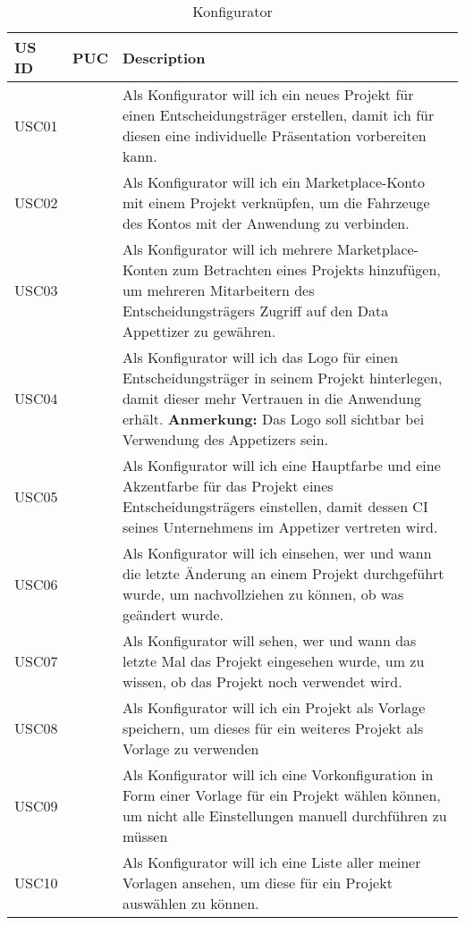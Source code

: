  \sffamily
  \begin{footnotesize}
    \renewcommand{\arraystretch}{1.4}
    \begin{longtable}[i i L]{ p{} p{} p{} }
      \caption                       %
          {Konfigurator} %
          \\
      \toprule
      \textbf{US ID} & \textbf{PUC} & \textbf{Description} \\
      \midrule

      USC01 & & Als Konfigurator will ich ein neues Projekt für einen Entscheidungsträger erstellen, damit ich für diesen eine individuelle Präsentation vorbereiten kann. \\
      USC02 & & Als Konfigurator will ich ein Marketplace-Konto mit einem Projekt verknüpfen, um die Fahrzeuge des Kontos mit der Anwendung zu verbinden. \\
      USC03 & & Als Konfigurator will ich mehrere Marketplace-Konten zum Betrachten eines Projekts hinzufügen, um mehreren Mitarbeitern des Entscheidungsträgers Zugriff auf den Data Appettizer zu gewähren. \\
      USC04 & & Als Konfigurator will ich das Logo für einen Entscheidungsträger in seinem Projekt hinterlegen, damit dieser mehr Vertrauen in die Anwendung erhält. 
      \textbf{Anmerkung:} Das Logo soll sichtbar bei Verwendung des Appetizers sein. \\
      USC05 & & Als Konfigurator will ich eine Hauptfarbe und eine Akzentfarbe für das Projekt eines Entscheidungsträgers einstellen, damit dessen CI seines Unternehmens im Appetizer vertreten wird. \\
      USC06 & & Als Konfigurator will ich einsehen, wer und wann die letzte Änderung an einem Projekt durchgeführt wurde, um nachvollziehen zu können, ob was geändert wurde. \\
      USC07 & & Als Konfigurator will sehen, wer und wann das letzte Mal das Projekt eingesehen wurde, um zu wissen, ob das Projekt noch verwendet wird. \\
      USC08 & & Als Konfigurator will ich ein Projekt als Vorlage speichern, um dieses für ein weiteres Projekt als Vorlage zu verwenden \\
      USC09 & & Als Konfigurator will ich eine Vorkonfiguration in Form einer Vorlage für ein Projekt wählen können, um nicht alle Einstellungen manuell durchführen zu müssen \\
      USC10 & & Als Konfigurator will ich eine Liste aller meiner Vorlagen ansehen, um diese für ein Projekt auswählen zu können. \\

\end{longtable}
\end{footnotesize}
